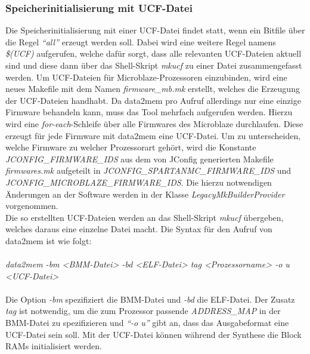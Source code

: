 \subsubsection{Speicherinitialisierung mit UCF-Datei}
Die Speicherinitialisierung mit einer UCF-Datei findet statt, wenn ein Bitfile über die Regel \textit{``all''} erzeugt werden soll. Dabei wird eine weitere Regel namens \textit{\$(UCF)} aufgerufen, welche dafür sorgt, dass alle relevanten UCF-Dateien aktuell sind und diese dann über das Shell-Skript \textit{mkucf} zu einer Datei zusammengefasst werden. Um UCF-Dateien für Microblaze-Prozessoren einzubinden, wird eine neues Makefile mit dem Namen \textit{firmware\_mb.mk} erstellt, welches die Erzeugung der UCF-Dateien handhabt. Da data2mem pro Aufruf allerdings nur eine einzige Firmware behandeln kann, muss das Tool mehrfach aufgerufen werden. Hierzu wird eine \textit{for-each}-Schleife über alle Firmwares des Microblaze durchlaufen. Diese erzeugt für jede Firmware mit data2mem eine UCF-Datei. Um zu unterscheiden, welche Firmware zu welcher Prozessorart gehört, wird die Konstante \textit{JCONFIG\_FIRMWARE\_IDS} aus dem von JConfig generierten Makefile \textit{firmwares.mk} aufgeteilt in \textit{JCONFIG\_SPARTANMC\_FIRMWARE\_IDS} und \textit{JCONFIG\_MICROBLAZE\_FIRMWARE\_IDS}. Die hierzu notwendigen Änderungen an der Software werden in der Klasse \textit{LegacyMkBuilderProvider} vorgenommen.\\
Die so erstellten UCF-Dateien werden an das Shell-Skript \textit{mkucf} übergeben, welches daraus eine einzelne Datei macht. Die Syntax für den Aufruf von data2mem ist wie folgt:\\\\
\indent
\textit{data2mem -bm <BMM-Datei> -bd <ELF-Datei> tag <Prozessorname> -o u <UCF-Datei>}\\\\
Die Option \textit{-bm} spezifiziert die BMM-Datei und \textit{-bd} die ELF-Datei. Der Zusatz \textit{tag} ist notwendig, um die zum Prozessor passende \textit{ADDRESS\_MAP} in der BMM-Datei zu spezifizieren und \textit{``-o u''} gibt an, dass das Ausgabeformat eine UCF-Datei sein soll. Mit der UCF-Datei können während der Synthese die Block RAMs initialisiert werden.

